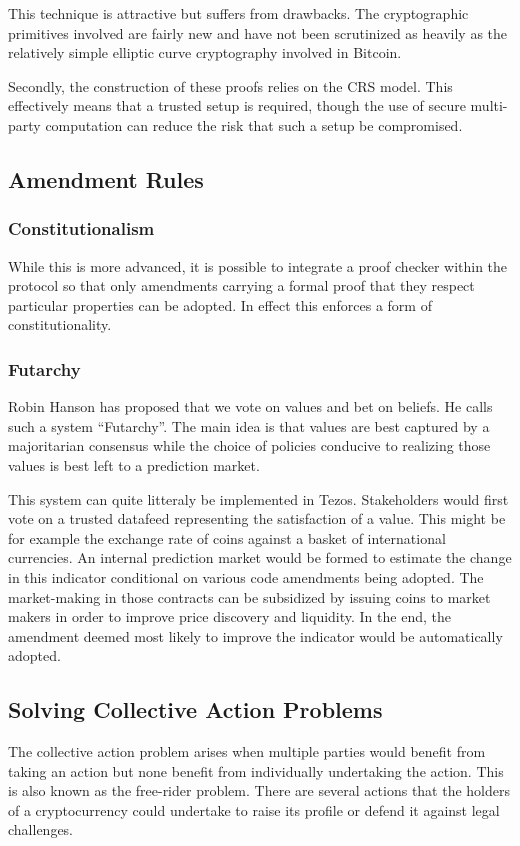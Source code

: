 \documentclass[letterpaper]{article}
\begin{document}
This technique is attractive but suffers from drawbacks.
The cryptographic primitives involved are fairly new
and have not been scrutinized as heavily
as the relatively simple elliptic curve cryptography involved in Bitcoin.

Secondly, the construction of these proofs relies on the CRS model.
This effectively means that a trusted setup is required,
though the use of secure multi-party computation
can reduce the risk that such a setup be compromised.

\subsection{Amendment Rules}

\subsubsection{Constitutionalism}

While this is more advanced, it is possible to integrate a proof checker
within the protocol so that only amendments carrying a formal proof that
they respect particular properties can be adopted. In effect this enforces
a form of constitutionality.

\subsubsection{Futarchy}
Robin Hanson has proposed that we vote on values and bet on beliefs.
He calls such a system ``Futarchy''\cite{Futarchy}. The main idea
is that values are best captured by a majoritarian consensus while the choice
of policies conducive to realizing those values is best left to a prediction
market.

This system can quite litteraly be implemented in Tezos. Stakeholders would
first vote on a trusted datafeed representing the satisfaction of a value. 
This might be for example the exchange rate of coins against a basket 
of international currencies. An internal prediction market would be formed
to estimate the change in this indicator conditional on various code 
amendments being adopted. The market-making in those contracts can be
subsidized by issuing coins to market makers in order to improve price discovery
and liquidity. In the end, the amendment deemed most likely to improve the
indicator would be automatically adopted.

\subsection{Solving Collective Action Problems}
The collective action problem arises when multiple parties would benefit from
taking an action but none benefit from individually undertaking the action.
This is also known as the free-rider problem.
There are several actions that the holders of a cryptocurrency could undertake
to raise its profile or defend it against legal challenges.
\end{document}
